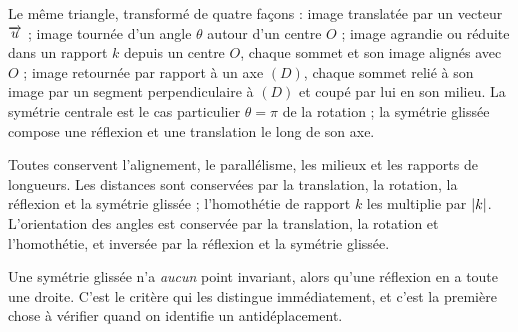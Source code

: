 \begin{visualisation}
\begin{center}
\end{center}
Le même triangle, transformé de quatre façons : image translatée par un
vecteur $\overrightarrow{u}$ ; image tournée d'un angle $\theta$ autour d'un centre $O$ ;
image agrandie ou réduite dans un rapport $k$ depuis un centre $O$, chaque
sommet et son image alignés avec $O$ ; image retournée par rapport à un axe
$(D)$, chaque sommet relié à son image par un segment perpendiculaire à
$(D)$ et coupé par lui en son milieu. La symétrie centrale est le cas
particulier $\theta = \pi$ de la rotation ; la symétrie glissée compose une
réflexion et une translation le long de son axe.
\end{visualisation}

\begin{propriete}
Toutes conservent l'alignement, le parallélisme, les milieux et les rapports
de longueurs. Les distances sont conservées par la translation, la rotation,
la réflexion et la symétrie glissée ; l'homothétie de rapport $k$ les
multiplie par $\left|k\right|$. L'orientation des angles est conservée par la
translation, la rotation et l'homothétie, et inversée par la réflexion et la
symétrie glissée.
\end{propriete}

\begin{avertissement}
Une symétrie glissée n'a \emph{aucun} point invariant, alors qu'une réflexion
en a toute une droite. C'est le critère qui les distingue immédiatement, et
c'est la première chose à vérifier quand on identifie un antidéplacement.
\end{avertissement}

